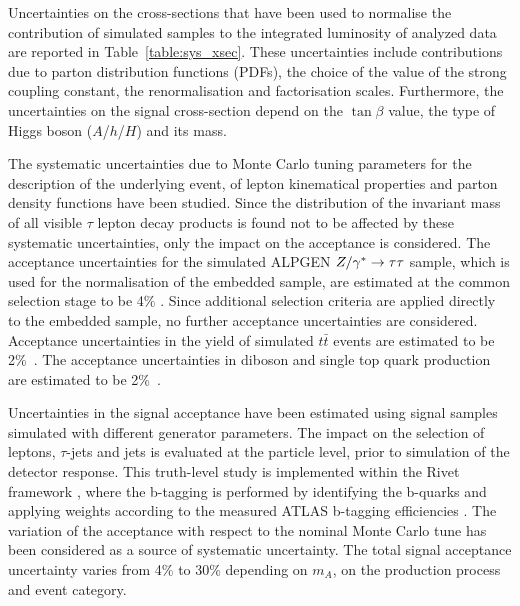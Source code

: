 Uncertainties on the cross-sections that have been used to normalise
the contribution of simulated samples to the integrated luminosity of analyzed data are reported in
Table~\ref{table:sys_xsec}. These
uncertainties include contributions due to parton distribution
functions (PDFs), the choice of the value of the strong coupling constant,
the renormalisation and factorisation scales.  Furthermore, the
uncertainties on the signal cross-section depend on the  $\tan\beta$ value, the type of  
Higgs boson ($A$/$h$/$H$) and its mass.

The  systematic uncertainties due to Monte Carlo tuning
parameters for the description of the  underlying event,
of lepton kinematical properties and parton density functions have been studied.
Since the distribution of the invariant mass of all visible $\tau$ lepton decay 
products is found not to be affected by these systematic uncertainties,
only the impact on the acceptance is considered.
The acceptance uncertainties for the simulated ALPGEN $Z/\gamma^*\rightarrow \tau\tau$  sample, which is 
used for the normalisation of the embedded sample, 
are estimated at the common selection stage to be 4\% \cite{ATLASLimit}.
Since additional selection criteria  are applied directly to the embedded sample, 
no further acceptance uncertainties are considered. Acceptance uncertainties in the yield of 
simulated $t\bar{t}$ events are estimated to be  2\%~\cite{ttbaremu}. %
The acceptance uncertainties in diboson and single top quark production are estimated to be 2\%~\cite{ATLASLimit}.

Uncertainties in the signal acceptance have been estimated using signal 
samples simulated with different generator parameters. The impact on the selection
 of leptons, $\tau$-jets  and jets is evaluated at the particle level, prior to 
simulation of the detector response. This truth-level study is implemented within the Rivet framework
\cite{RIVET}, where the b-tagging is performed by identifying the b-quarks and applying
 weights according to the measured ATLAS b-tagging
efficiencies \cite{BtaggingScaleFactors}. The variation of the acceptance
with respect to the nominal Monte Carlo tune has  been considered as
a source of systematic uncertainty. The total signal acceptance 
uncertainty varies from 4\% to 30\% depending on $m_A$, on the production process 
and event category.

